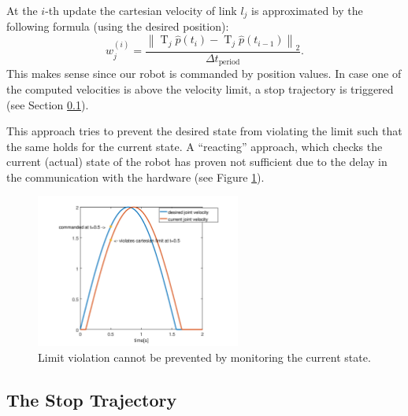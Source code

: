 \documentclass{article}
\begin{document}
At the $i$-th update the cartesian velocity of link $l_j$ is approximated by the following formula (using the desired position):
\begin{equation}
  w_{j}^{(i)} = \frac{\left\|\operatorname{T}_{j}\hat{p}(t_i)-\operatorname{T}_{j}\hat{p}(t_{i-1})\right\|_{2}}{\Delta t_{\mathrm{period}}}.
\end{equation}
This makes sense since our robot is commanded by position values. In case one of the computed velocities is above the velocity limit, a stop trajectory is triggered (see Section \ref{sec:the_stop_trajectory}).

This approach tries to prevent the desired state from violating the limit such that the same holds for the current state. A ``reacting'' approach, which checks the current (actual) state of the robot has proven not sufficient due to the delay in the communication with the hardware (see Figure \ref{fig:react_on_current}).

\begin{figure}
\centering
\includegraphics[width=0.6\textwidth]{figures/react_on_current_plot.png}
\caption{Limit violation cannot be prevented by monitoring the current state.}
\label{fig:react_on_current}
\end{figure}

\subsection{The Stop Trajectory}\label{sec:the_stop_trajectory}
\end{document}
